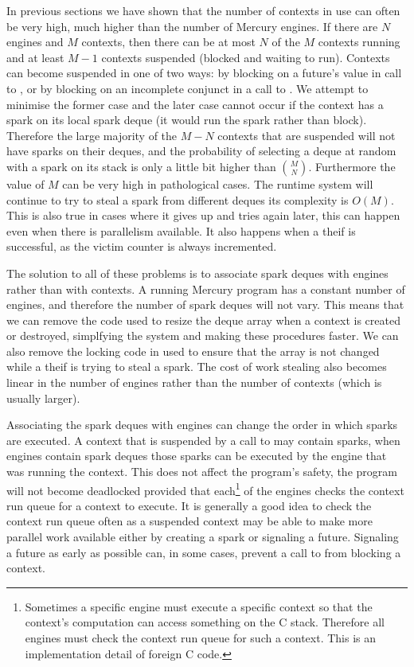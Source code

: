 \begin{description}
    In previous sections
    we have shown that the number of contexts in use can often be very high,
    much higher than the number of Mercury engines.
    If there are $N$ engines and $M$ contexts,
    then there can be at most $N$ of the $M$ contexts running and
    at least $M-1$ contexts suspended (blocked and waiting to run).
    Contexts can become suspended in one of two ways:
    by blocking on a future's value in call to \wait,
    or by blocking on an incomplete conjunct in a call to \joinandcontinue.
    We attempt to minimise the former case and the later case cannot occur
    if the context has a spark on its local spark deque (it would run the
    spark rather than block).
    Therefore the large majority of the $M-N$ contexts that are suspended
    will not have sparks on their deques,
    and the probability of selecting a deque at random with a spark on its
    stack is only a little bit higher than $M \choose N$.
    Furthermore the value of $M$ can be very high in pathological cases.
    The runtime system will continue to try to steal a spark from different
    deques its complexity is $O(M)$.
    This is also true in cases where it gives up and tries again later,
    this can happen even when there is parallelism available.
    It also happens when a theif is successful,  
    as the victim counter is always incremented.

\end{description}

\noindent
{}
The solution to all of these problems is to associate spark deques with
engines rather than with contexts.
A running Mercury program has a constant number of engines,
and therefore the number of spark deques will not vary.
This means that we can remove the code used to resize the deque array when a
context is created or destroyed, simplfying the system and making these
procedures faster.
We can also remove the locking code in \trystealspark used to ensure that
the array is not changed while a theif is trying to steal a spark.
The cost of work stealing also becomes linear in the number of engines
rather than the number of contexts (which is usually larger).

Associating the spark deques with engines can change the order in which
sparks are executed.
A context that is suspended by a call to \wait may contain sparks,
when engines contain spark deques those sparks can be executed by the engine
that was running the context.
This does not affect the program's safety,
the program will not become deadlocked provided that
each\footnote{
    Sometimes a specific engine must execute a specific context so that the
    context's computation can access something on the C stack.
    Therefore all engines must check the context run queue for such a
    context.
    This is an implementation detail of foreign C code.
    }
of the engines checks the context run queue for a context
to execute.
It is generally a good idea to check the context run queue often as a
suspended context may be able to make more parallel work available either by
creating a spark or signaling a future.
Signaling a future as early as possible can,
in some cases,
prevent a call to \wait from blocking a context.

